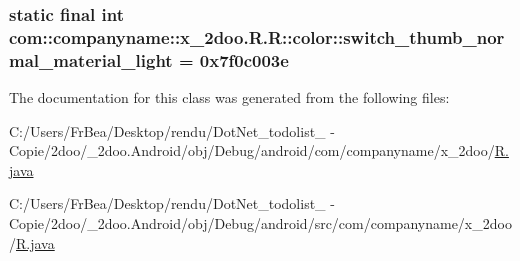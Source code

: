 \hypertarget{classcom_1_1companyname_1_1x__2doo_1_1_r_1_1color_c3950d402b22cc48e74c75ba732755ef}{
\subsubsection[{switch\_\-thumb\_\-normal\_\-material\_\-light}]{\setlength{\rightskip}{0pt plus 5cm}static final int com::companyname::x\_\-2doo.R.R::color::switch\_\-thumb\_\-normal\_\-material\_\-light = 0x7f0c003e}}
\label{classcom_1_1companyname_1_1x__2doo_1_1_r_1_1color_c3950d402b22cc48e74c75ba732755ef}




The documentation for this class was generated from the following files:\begin{CompactItemize}
\item 
C:/Users/FrBea/Desktop/rendu/DotNet\_\-todolist\_ - Copie/2doo/\_\-2doo.Android/obj/Debug/android/com/companyname/x\_\-2doo/\hyperlink{com_2companyname_2x__2doo_2_r_8java}{R.java}\item 
C:/Users/FrBea/Desktop/rendu/DotNet\_\-todolist\_ - Copie/2doo/\_\-2doo.Android/obj/Debug/android/src/com/companyname/x\_\-2doo/\hyperlink{src_2com_2companyname_2x__2doo_2_r_8java}{R.java}\end{CompactItemize}
